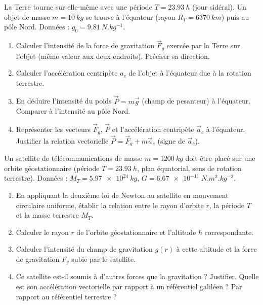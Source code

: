 \documentclass[11pt]{article}
\begin{document}
\begin{exercice}
La Terre tourne sur elle-même avec une période $T = \SI{23,93}{h}$ (jour sidéral). Un objet de masse $m = \SI{10}{kg}$ se trouve à l'équateur (rayon $R_T = \SI{6370}{km}$) puis au pôle Nord.
Données : $g_0 = \SI{9,81}{N.kg^{-1}}$.
\begin{enumerate}
    \item Calculer l'intensité de la force de gravitation $\vec{F}_g$ exercée par la Terre sur l'objet (même valeur aux deux endroits). Préciser sa direction.
    \item Calculer l'accélération centripète $a_c$ de l'objet à l'équateur due à la rotation terrestre.
    \item En déduire l'intensité du poids $\vec{P} = m\vec{g}$ (champ de pesanteur) à l'équateur. Comparer à l'intensité au pôle Nord.
    \item Représenter les vecteurs $\vec{F}_g$, $\vec{P}$ et l'accélération centripète $\vec{a}_c$ à l'équateur. Justifier la relation vectorielle $\vec{P} = \vec{F}_g + m\vec{a}_c$ (signe de $\vec{a}_c$).
\end{enumerate}
\end{exercice}

\begin{exercice}
Un satellite de télécommunications de masse $m = \SI{1200}{kg}$ doit être placé sur une orbite géostationnaire (période $T = \SI{23,93}{h}$, plan équatorial, sens de rotation terrestre).
Données : $M_T = \SI{5,97e24}{kg}$, $G = \SI{6,67e-11}{N.m^2.kg^{-2}}$.
\begin{enumerate}
    \item En appliquant la deuxième loi de Newton au satellite en mouvement circulaire uniforme, établir la relation entre le rayon d'orbite $r$, la période $T$ et la masse terrestre $M_T$.
    \item Calculer le rayon $r$ de l'orbite géostationnaire et l'altitude $h$ correspondante.
    \item Calculer l'intensité du champ de gravitation $g(r)$ à cette altitude et la force de gravitation $F_g$ subie par le satellite.
    \item Ce satellite est-il soumis à d'autres forces que la gravitation ? Justifier. Quelle est son accélération vectorielle par rapport à un référentiel galiléen ? Par rapport au référentiel terrestre ?
\end{enumerate}
\end{exercice}
\end{document}
